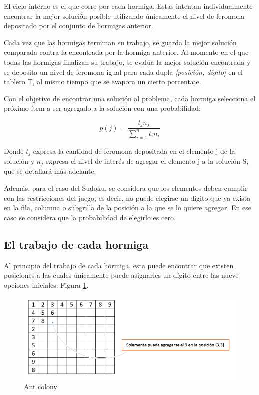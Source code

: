 \documentclass[a4paper,spanish]{article}
\begin{document}
El ciclo interno es el que corre por cada hormiga. Estas intentan individualmente encontrar la
mejor solución posible utilizando únicamente el nivel de feromona depositado por el conjunto
de hormigas anterior. 

Cada vez que las hormigas terminan su trabajo, se guarda la mejor solución comparada contra la
encontrada por la hormiga anterior. Al momento en el que todas las hormigas finalizan su trabajo,
se evalúa la mejor solución encontrada y se deposita un nivel de feromona igual para cada dupla
\emph{[posición, dígito]} en el tablero T, al mismo tiempo que se evapora un cierto porcentaje.

Con el objetivo de encontrar una solución al problema, cada hormiga selecciona el próximo ítem 
a ser agregado a la solución con una probabilidad:

\begin{equation}
	p(j) = \dfrac{t_j n_j}{\sum\limits_{i=1}^n t_i n_i}
\end{equation}

Donde $t_j$ expresa la cantidad de feromona depositada en el elemento j de la solución y $n_j$
expresa el nivel de interés de agregar el elemento j a la solución S, que se detallará más adelante.

Además, para el caso del Sudoku, se considera que los elementos deben cumplir con las restricciones
del juego, es decir, no puede elegirse un dígito que ya exista en la fila, columna o subgrilla de la
posición a la que se lo quiere agregar. En ese caso se considera que la probabilidad de elegirlo es cero.

\clearpage

\subsection{El trabajo de cada hormiga}

Al principio del trabajo de cada hormiga, esta puede encontrar que existen posiciones a las cuales
únicamente puede asignarles un dígito entre las nueve opciones iniciales. Figura \ref{img:soloundigito}.

\begin{figure}[h]
	\centering
	\includegraphics[scale=0.4]{./img/soloundigito.png}
	\caption{Ant colony}
	\label{img:soloundigito}
\end{figure}
\end{document}
